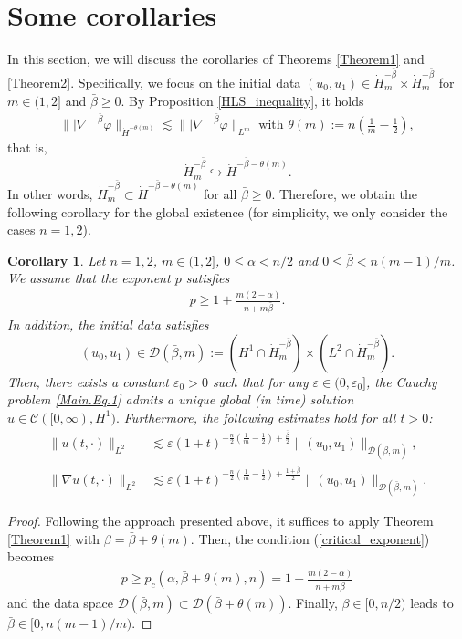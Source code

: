 \documentclass[11pt,reqno]{amsart}
\newtheorem{corollary}{Corollary}[section]
\begin{document}
\section{Some corollaries}\label{Section4}
In this section, we will discuss the corollaries of Theorems \ref{Theorem1} and \ref{Theorem2}. Specifically, we focus on the initial data $(u_0, u_1) \in \dot{H}_m^{-\bar{\beta}} \times \dot{H}_m^{-\bar{\beta}}$ for $m \in (1,2]$ and $\bar{\beta} \geq 0$. By Proposition \ref{HLS_inequality},  it holds
\begin{align*}
    \||\nabla|^{-\bar{\beta}} \varphi\|_{\dot{H}^{-\theta(m)}}  \lesssim \| |\nabla|^{-\bar{\beta}} \varphi\|_{L^m} \text{ with } \theta(m) := n\left(\frac{1}{m}-\frac{1}{2}\right),
\end{align*}
that is, $$\dot{H}_m^{-\bar{\beta}} \hookrightarrow \dot{H}^{-\bar{\beta}-\theta(m)}.$$
In other words, $\dot{H}_m^{-\bar{\beta}} \subset \dot{H}^{-\bar{\beta}-\theta(m)}$ for all $\bar{\beta} \geq 0$. Therefore, we obtain the following corollary for the global existence (for simplicity, we only consider the cases $n =1,2$). 
\begin{corollary}\label{Corollary4.1}
Let $n=1,2$, $ m \in (1,2]$, $0 \leq \alpha < n/2$ and $0 \leq \bar{\beta} < n(m-1)/m$. We assume that the exponent $p$ satisfies  
        \begin{align*}
            p \geq 1+ \frac{m(2-\alpha)}{n+m\bar{\beta}}.
        \end{align*}
        In addition, the initial data satisfies
            $$(u_0, u_1) \in \mathcal{D}(\bar{\beta}, m) := (H^1 \cap \dot{H}_m^{-\bar{\beta}})\times (L^2 \cap \dot{H}_m^{-\bar{\beta}}).$$
       Then, there exists a constant $\varepsilon_0 > 0$ such that for any $\varepsilon \in (0, \varepsilon_0]$, the Cauchy problem \eqref{Main.Eq.1} admits a unique global (in time) solution 
        $
            u \in \mathcal{C}([0, \infty), H^1).
        $
      Furthermore, the following estimates hold for all $t > 0$:
        \begin{align*}
            \|u(t,\cdot)\|_{L^2} &\lesssim \varepsilon (1+t)^{-\frac{n}{2}(\frac{1}{m}-\frac{1}{2})+\frac{\bar{\beta}}{2}} \|(u_0,u_1)\|_{\mathcal{D}(\bar{\beta},m)},\\
            \|\nabla u(t,\cdot)\|_{L^2} &\lesssim \varepsilon (1+t)^{-\frac{n}{2}(\frac{1}{m}-\frac{1}{2})+\frac{1+\bar{\beta}}{2}} \|(u_0,u_1)\|_{\mathcal{D}(\bar{\beta}, m)}.
        \end{align*}    
\end{corollary}
\begin{proof}
    Following the approach presented above, it suffices to apply Theorem \ref{Theorem1} with $\beta = \bar{\beta} +\theta(m)$. Then, the condition (\ref{critical_exponent}) becomes
    \begin{align*}
        p \geq p_c(\alpha, \bar{\beta}+\theta(m), n) = 1+\frac{m(2-\alpha)}{n+m\bar{\beta}}
    \end{align*}
    and the data space
   $
        \mathcal{D}(\bar{\beta}, m) \subset \mathcal{D}(\bar{\beta} +\theta(m)).
    $
    Finally, $\beta \in [0, n/2)$ leads to $\bar{\beta} \in [0, n(m-1)/m)$.
\end{proof}
\end{document}
